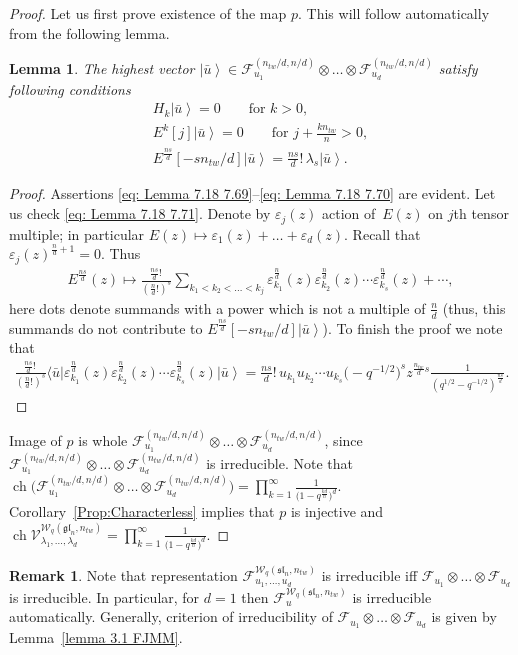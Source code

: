\documentclass[pdftex]{sigma}
\numberwithin{equation}{section}
\newtheorem{Lemma}[Theorem]{Lemma}
\theoremstyle{definition}
\newtheorem{Remark}[Theorem]{Remark}
\newcommand{ \twW }{ \mathcal{W}_{q} ( \mathfrak{sl}_n, n_{tw} ) }
\newcommand{ \twWgl }{ \mathcal{W}_{q} ( \mathfrak{gl}_n, n_{tw} ) }
\newcommand{\WFock}{\mathcal{F}^{\twW}_{u_1, \dots, u_d}}
\newcommand{\Vergl}{\mathcal{V}^{\twWgl}_{\lambda_1, \dots, \lambda_d} }
\newcommand{\vacF}{ \left| \bar{u} \right\rangle}
\newcommand{\e}{\varepsilon}
\DeclareMathOperator{\ch}{ch}
\newcommand{\fact}{\frac{ns}{d}! \,}
\begin{document}
\begin{proof}
Let us first prove existence of the map $p$. This will follow automatically from the following lemma.
\begin{Lemma}
The highest vector $\vacF \in \mathcal{F}^{(n_{tw}/d, n/d)}_{u_1} \otimes \dots \otimes \mathcal{F}^{(n_{tw}/d, n/d)}_{u_d}$ satisfy following conditions
\begin{gather}
H_k \vacF=0 \qquad \text{for $k>0$}, \label{eq: Lemma 7.18 7.69}\\
E^k[j] \vacF =0 \qquad \text{for $j+\frac{kn_{tw}}{n}>0$}, \label{eq: Lemma 7.18 7.70} \\
E^{\frac{ns}{d}}[-sn_{tw}/d] \vacF = \fact \lambda_s \vacF. \label{eq: Lemma 7.18 7.71}
\end{gather}
\end{Lemma}
\begin{proof}
Assertions \eqref{eq: Lemma 7.18 7.69}--\eqref{eq: Lemma 7.18 7.70} are evident. Let us check \eqref{eq: Lemma 7.18 7.71}. Denote by $\e_j(z)$ action of~$E(z)$ on $j$th tensor multiple; in particular $E(z) \mapsto \e_1(z) + \dots + \e_d(z)$. Recall that $\e_j(z)^{\frac{n}{d}+1}=0$. Thus
\begin{gather*}
E^{\frac{ns}{d}} (z) \mapsto \frac{\fact}{(\frac{n}{d}!)^{s}} \sum_{k_1< k_2 < \dots < k_j} \e_{k_1}^{\frac{n}{d}} (z) \e_{k_2}^{\frac{n}{d}} (z) \cdots \e_{k_s}^{\frac{n}{d}} (z) + \cdots,
\end{gather*}
here dots denote summands with a power which is not a multiple of $\frac{n}{d}$ (thus, this summands do not contribute to $E^{\frac{ns}{d}}[-sn_{tw}/d] \vacF$). To finish the proof we note that
\begin{gather*}
\frac{\fact}{(\frac{n}{d}!)^{s}} \langle \bar{u} | \e_{k_1}^{\frac{n}{d}} (z) \e_{k_2}^{\frac{n}{d}} (z) \cdots \e_{k_s}^{\frac{n}{d}} (z) \vacF = \fact u_{k_1} u_{k_2} \cdots u_{k_s} \big( {-} q^{-1/2} \big)^s z^{ \frac{n_{tw}}{d}s } \frac{1}{(q^{1/2} - q^{-1/2})^{\frac{ns}{d}}} .\!\!\!\!\tag*{\qed}
\end{gather*}\renewcommand{\qed}{}
\end{proof}

Image of $p$ is whole $\mathcal{F}^{(n_{tw}/d, n/d)}_{u_1} \otimes \dots \otimes \mathcal{F}^{(n_{tw}/d, n/d)}_{u_d}$, since $\mathcal{F}^{(n_{tw}/d, n/d)}_{u_1} \otimes \dots \otimes \mathcal{F}^{(n_{tw}/d, n/d)}_{u_d}$ is irreducible. Note that $\ch \big( \mathcal{F}^{(n_{tw}/d, n/d)}_{u_1} \otimes \dots \otimes \mathcal{F}^{(n_{tw}/d, n/d)}_{u_d} \big) = \prod\limits_{k=1}^{\infty} \frac{1}{ \big(1-q^{\frac{kd}{n}} \big)^d }$. Corollary~\ref{Prop:Characterless} implies that $p$ is injective and $\ch \Vergl = \prod\limits_{k=1}^{\infty} \frac{1}{ \big(1-q^{\frac{kd}{n}} \big)^d }$.
\end{proof}
\begin{Remark}
Note that representation $\WFock$ is irreducible iff $\mathcal{F}_{u_1} \otimes \dots \otimes \mathcal{F}_{u_d}$ is irreducible.
In particular, for $d =1$ then $\mathcal{F}^{\twW}_u$ is irreducible automatically. Generally, criterion of irreducibility of $\mathcal{F}_{u_1} \otimes \dots \otimes \mathcal{F}_{u_d}$ is given by Lemma~\ref{lemma 3.1 FJMM}.
\end{Remark}
\end{document}
